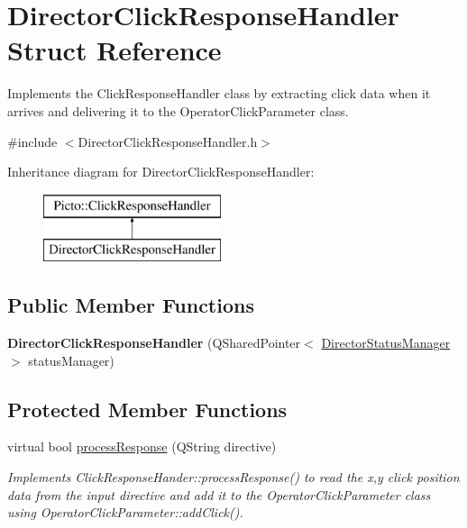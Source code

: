 \hypertarget{struct_director_click_response_handler}{\section{Director\-Click\-Response\-Handler Struct Reference}
\label{struct_director_click_response_handler}
}


Implements the Click\-Response\-Handler class by extracting click data when it arrives and delivering it to the Operator\-Click\-Parameter class.  




{\ttfamily \#include $<$Director\-Click\-Response\-Handler.\-h$>$}

Inheritance diagram for Director\-Click\-Response\-Handler\-:\begin{figure}[H]
\begin{center}
\leavevmode
\includegraphics[height=2.000000cm]{struct_director_click_response_handler}
\end{center}
\end{figure}
\subsection*{Public Member Functions}
\begin{DoxyCompactItemize}
\item 
\hypertarget{struct_director_click_response_handler_ad0e4686081d6fea8e349218fa55b65d0}{{\bfseries Director\-Click\-Response\-Handler} (Q\-Shared\-Pointer$<$ \hyperlink{class_director_status_manager}{Director\-Status\-Manager} $>$ status\-Manager)}\label{struct_director_click_response_handler_ad0e4686081d6fea8e349218fa55b65d0}

\end{DoxyCompactItemize}
\subsection*{Protected Member Functions}
\begin{DoxyCompactItemize}
\item 
\hypertarget{struct_director_click_response_handler_a34b38a742d0c4f1ca810a4208165aadf}{virtual bool \hyperlink{struct_director_click_response_handler_a34b38a742d0c4f1ca810a4208165aadf}{process\-Response} (Q\-String directive)}\label{struct_director_click_response_handler_a34b38a742d0c4f1ca810a4208165aadf}

\begin{DoxyCompactList}\small\item\em Implements Click\-Response\-Hander\-::process\-Response() to read the x,y click position data from the input directive and add it to the Operator\-Click\-Parameter class using Operator\-Click\-Parameter\-::add\-Click(). \end{DoxyCompactList}\end{DoxyCompactItemize}


